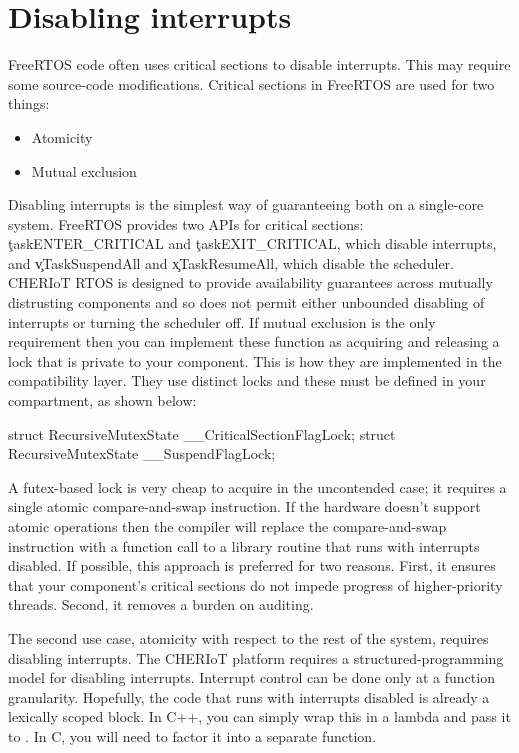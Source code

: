 \section{Disabling interrupts}

FreeRTOS code often uses critical sections to disable interrupts.
This may require some source-code modifications.
Critical sections in FreeRTOS are used for two things:

\begin{itemize}
	\item{Atomicity}
	\item{Mutual exclusion}
\end{itemize}

Disabling interrupts is the simplest way of guaranteeing both on a single-core system.
FreeRTOS provides two APIs for critical sections: \c{taskENTER_CRITICAL} and \c{taskEXIT_CRITICAL}, which disable interrupts, and \c{vTaskSuspendAll} and \c{xTaskResumeAll}, which disable the scheduler.
CHERIoT RTOS is designed to provide availability guarantees across mutually distrusting components and so does not permit either unbounded disabling of interrupts or turning the scheduler off.
If mutual exclusion is the only requirement then you can implement these function as acquiring and releasing a lock that is private to your component.
This is how they are implemented in the compatibility layer.
They use distinct locks and these must be defined in your compartment, as shown below:

\begin{cxxsnippet}
struct RecursiveMutexState __CriticalSectionFlagLock;
struct RecursiveMutexState __SuspendFlagLock;
\end{cxxsnippet}

A futex-based lock is very cheap to acquire in the uncontended case; it requires a single atomic compare-and-swap instruction.
If the hardware doesn't support atomic operations then the compiler will replace the compare-and-swap instruction with a function call to a library routine that runs with interrupts disabled.
If possible, this approach is preferred for two reasons.
First, it ensures that your component's critical sections do not impede progress of higher-priority threads.
Second, it removes a burden on auditing.

The second use case, atomicity with respect to the rest of the system, requires disabling interrupts.
The CHERIoT platform requires a structured-programming model for disabling interrupts.
Interrupt control can be done only at a function granularity.
Hopefully, the code that runs with interrupts disabled is already a lexically scoped block.
In C++, you can simply wrap this in a lambda and pass it to .
In C, you will need to factor it into a separate function.

